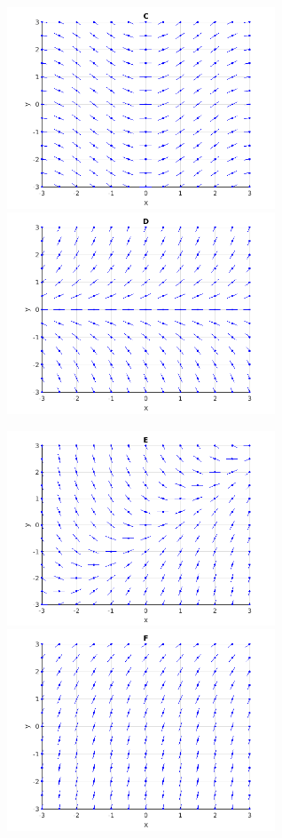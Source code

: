 \begin{question}
\includegraphics[width=8cm]{10_equ_diff/question2c}
\includegraphics[width=8cm]{10_equ_diff/question2d}

\includegraphics[width=8cm]{10_equ_diff/question2e}
\includegraphics[width=8cm]{10_equ_diff/question2f}
\label{10Q45}
\end{question}

